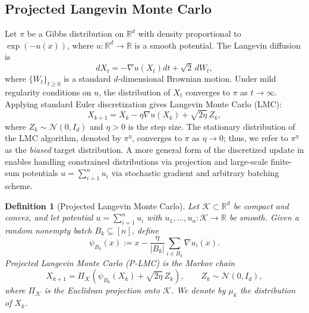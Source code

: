 \documentclass[10pt, journal]{IEEEtran}
\makeatletter
\def\eqref#1{equation~\ref{#1}}
\renewcommand{\eqref}[1]{\textup{\tagform@{\ref{#1}}}}
\newtheorem{definition}{Definition}
\makeatother
\begin{document}
\subsection{Projected Langevin Monte Carlo} \label{Sec:PLMC} 
Let $\pi$ be a Gibbs distribution on $\mathbb R^d$ with density proportional to $\exp(-u(x))$, where $u:\mathbb R^d\to\mathbb R$ is a smooth potential. The Langevin diffusion is $$dX_t=-\nabla u(X_t)dt+\sqrt2\,dW_t,$$ where $\{W_t\}_{t\ge0}$ is a standard $d$-dimensional Brownian motion. Under mild regularity conditions on $u$, the distribution of $X_t$ converges to $\pi$ as $t \to \infty$. Applying standard Euler discretization gives Langevin Monte Carlo (LMC): 
\begin{equation}\label{eq:LMC1}
  X_{k+1}=X_k-\eta\nabla u(X_k)+\sqrt{2\eta}\,Z_k,  
\end{equation}
 where $Z_k\sim\mathcal N(0,I_d)$ and $\eta>0$ is the step size. The stationary distribution of the LMC algorithm, denoted by $\pi^\eta$, converges to $\pi$ as $\eta \to 0$; thus, we refer to $\pi^\eta$ as the \textit{biased} target distribution. 
A more general form of the discretized update in \eqref{eq:LMC1} enables handling constrained distributions via projection and large-scale finite-sum potentials $u = \sum_{i=1}^n u_i$ via stochastic gradient and arbitrary batching scheme. 
\begin{definition}[Projected Langevin Monte Carlo] \label{projectedLMC} Let $\mathcal K\subset\mathbb R^d$ be compact and convex, and let potential $u = \sum_{i=1}^nu_i$ with $u_1,\ldots,u_n:\mathcal K\to\mathbb R$ be smooth. Given a random nonempty batch $B_k\subseteq[n]$, define 
\begin{equation}\label{eq:updatePLMC}
    \psi_{B_k}(x):=x-\frac{\eta}{|B_k|}\sum_{i\in B_k}\nabla u_i(x).
\end{equation} Projected Langevin Monte Carlo (P-LMC) is the Markov chain 
\begin{equation}\label{eq:PLMC}
    X_{k+1}=\Pi_{\mathcal K}\left(\psi_{B_k}(X_k)+\sqrt{2\eta}\,Z_k\right),\qquad Z_k\sim\mathcal N(0,I_d),
\end{equation} where $\Pi_{\mathcal K}$ is the Euclidean projection onto $\mathcal K$. We denote by  $\mu_k$ the distribution of $X_k$.
\end{definition}
\end{document}
